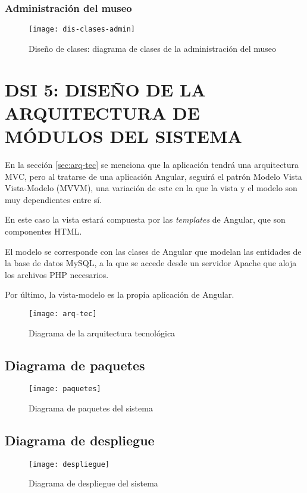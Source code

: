 \subsubsection{Administración del museo}
\begin{figure}[H]
\centering
\centerline{\texttt{[image: dis-clases-admin]}}
\caption{Diseño de clases: diagrama de clases de la administración del museo}
\end{figure}

\newpage
\section{DSI 5: DISEÑO DE LA ARQUITECTURA DE MÓDULOS DEL SISTEMA}

En la sección \ref{sec:arq-tec} se menciona que la aplicación tendrá una arquitectura MVC, pero al tratarse de una aplicación Angular, seguirá el patrón Modelo Vista Vista-Modelo (MVVM), una variación de este en la que la vista y el modelo son muy dependientes entre sí. \par 
En este caso la vista estará compuesta por las \textit{templates} de Angular, que son componentes HTML.\par
El modelo se corresponde con las clases de Angular que modelan las entidades de la base de datos MySQL, a la que se accede desde un servidor Apache que aloja los archivos PHP necesarios.\par
Por último, la vista-modelo es la propia aplicación de Angular.
\begin{figure}[H]
\vspace{4mm}
\centering
\centerline{\texttt{[image: arq-tec]}}
\caption{Diagrama de la arquitectura tecnológica}
\end{figure}

\subsection{Diagrama de paquetes}
\begin{figure}[H]
\centering
\centerline{\texttt{[image: paquetes]}}
\caption{Diagrama de paquetes del sistema}
\end{figure}


\subsection{Diagrama de despliegue}
\begin{figure}[H]
\centering
\centerline{\texttt{[image: despliegue]}}
\caption{Diagrama de despliegue del sistema}
\end{figure}


